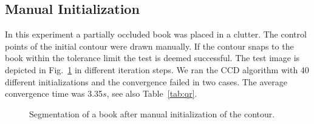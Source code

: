 \documentclass[conference]{IEEEtran}
\begin{document}
\subsection{Manual Initialization}
In this experiment  a partially occluded book was placed in a clutter. 
The control points of the initial contour were drawn manually. 
If the contour snaps to the book within the tolerance limit
the test is deemed successful. The test image is depicted in Fig.~\ref{fig:book}
in different iteration steps. We ran the CCD algorithm with 40 different initializations and the convergence
failed in two cases. The average convergence time was 3.35$s$, see also Table~\ref{tab:qr}.
\begin{figure}[htbp]
  \begin{minipage}[t]{0.49\linewidth} 
    \centering 
  \end{minipage} 
  \begin{minipage}[t]{0.49\linewidth} 
    \centering 
  \end{minipage} 
  \begin{minipage}[t]{0.49\linewidth} 
    \centering 
  \end{minipage} 
  \begin{minipage}[t]{0.49\linewidth} 
    \centering 
  \end{minipage} 
  \caption{Segmentation of a book after manual initialization of the contour.}
  \label{fig:book}
\end{figure}
\end{document}
